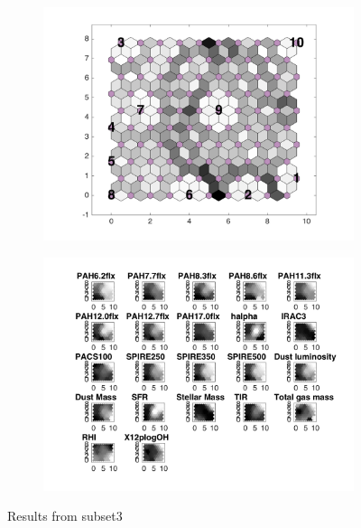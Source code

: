 \begin{figure}
    \begin{subfigure}[b]{0.5\textwidth}
        \centering
        \includegraphics[width=\textwidth]{../../images0.01/M31/2D/image_subsets/subset3_dist_with_hits_t.png}
        \label{fig: subset3_dist}
    \end{subfigure}
    \hfill
    \begin{subfigure}[b]{0.5\textwidth}
        \includegraphics[width=\textwidth]{../../images0.01/M31/2D/image_subsets/weight_planes_subset3.png}
        \label{fig: subset3_plane}
    \end{subfigure}
    \caption{Results from subset3}
    \label{fig: subset3}
\end{figure}